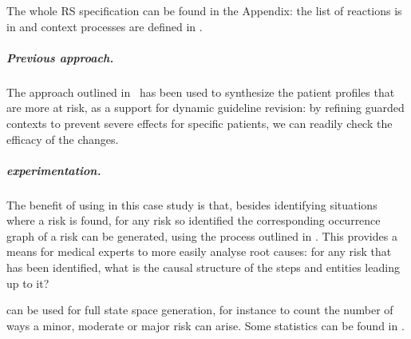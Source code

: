 The whole RS specification can be found in the Appendix: the list of reactions is in  and context processes are defined in .

\subparagraph*{Previous approach.}
The approach outlined in~\cite{DBLP:conf/cmsb/BowlesBBFGM24} has been used to synthesize the patient profiles that are more at risk, as a support for dynamic guideline revision: by refining guarded contexts to prevent severe effects for specific patients, we can readily check the efficacy of the changes.

\subparagraph*{\GROOVE experimentation.}

The benefit of using \GROOVE in this case study is that, besides identifying situations where a risk is found, for any risk so identified the corresponding occurrence graph of a risk can be generated, using the process outlined in . This provides a means for medical experts to more easily analyse root causes: for any risk that has been identified, what is the causal structure of the steps and entities leading up to it?

\GROOVE can be used for full state space generation, for instance to count the number of ways a minor, moderate or major risk can arise. Some statistics can be found in .

